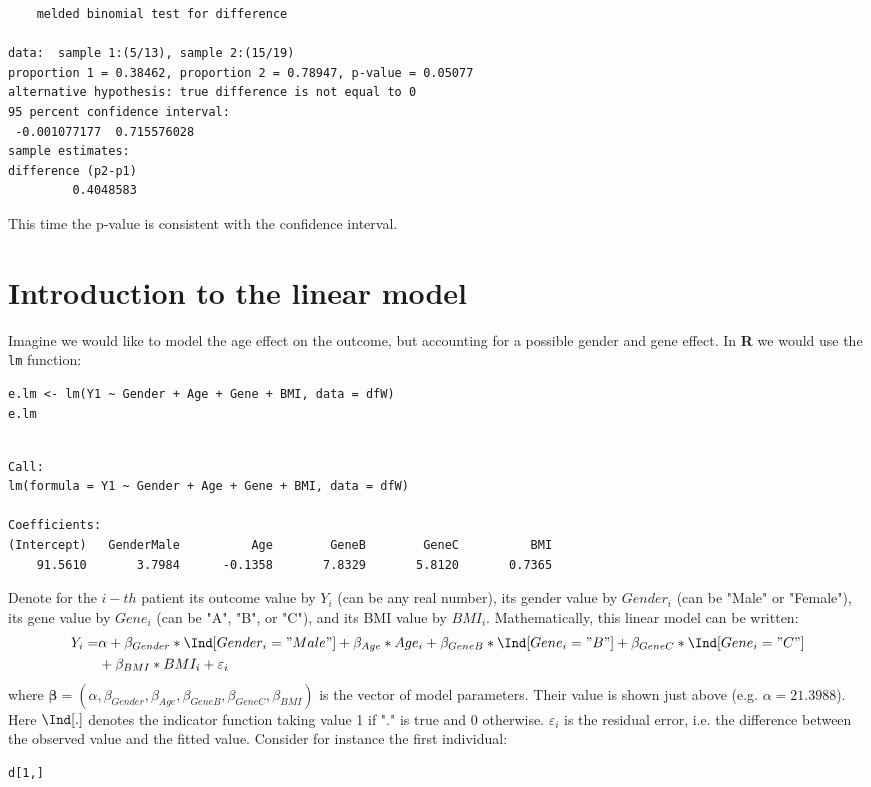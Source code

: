 \documentclass[12pt]{article}
\newcommand\Rlogo{\textbf{\textsf{R}}\xspace} %
\begin{document}
\begin{verbatim}
	melded binomial test for difference

data:  sample 1:(5/13), sample 2:(15/19)
proportion 1 = 0.38462, proportion 2 = 0.78947, p-value = 0.05077
alternative hypothesis: true difference is not equal to 0
95 percent confidence interval:
 -0.001077177  0.715576028
sample estimates:
difference (p2-p1) 
         0.4048583
\end{verbatim}

This time the p-value is consistent with the confidence interval. 
\clearpage


\section{Introduction to the linear model}
\label{sec:lm}
Imagine we would like to model the age effect on the outcome, but
accounting for a possible gender and gene effect. In \Rlogo{} we would
use the \texttt{lm} function:
\lstset{language=r,label= ,caption= ,captionpos=b,numbers=none}
\begin{lstlisting}
e.lm <- lm(Y1 ~ Gender + Age + Gene + BMI, data = dfW)
e.lm
\end{lstlisting}

\begin{verbatim}

Call:
lm(formula = Y1 ~ Gender + Age + Gene + BMI, data = dfW)

Coefficients:
(Intercept)   GenderMale          Age        GeneB        GeneC          BMI  
    91.5610       3.7984      -0.1358       7.8329       5.8120       0.7365
\end{verbatim}

Denote for the \(i-th\) patient its outcome value by \(Y_i\) (can be
any real number), its gender value by \(Gender_i\) (can be "Male" or
"Female"), its gene value by \(Gene_i\) (can be "A", "B", or
"C"), and its BMI value by \(BMI_i\). Mathematically, this linear model can be written:
\begin{align*}
Y_i =& \alpha + \beta_{Gender} * \Ind[Gender_i="Male"] + \beta_{Age} * Age_i + \beta_{GeneB} *  \Ind[Gene_i="B"] + \beta_{GeneC} * \Ind[Gene_i="C"] \\
& + \beta_{BMI} * BMI_i + \varepsilon_i
\end{align*}
where \(\boldsymbol{\beta} =
(\alpha,\beta_{Gender},\beta_{Age},\beta_{GeneB},\beta_{GeneC},\beta_{BMI})\) is
the vector of model parameters. Their value is shown just above
(e.g. \(\alpha=21.3988\)). Here \(\Ind[.]\) denotes the indicator
function taking value 1 if "." is true and 0
otherwise. \(\varepsilon_i\) is the residual error, i.e. the
difference between the observed value and the fitted value. Consider
for instance the first individual:
\lstset{language=r,label= ,caption= ,captionpos=b,numbers=none}
\begin{lstlisting}
d[1,]
\end{lstlisting}
\end{document}

